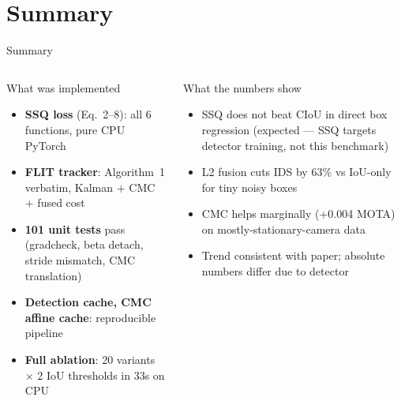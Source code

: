 \documentclass[aspectratio=169, 10pt]{beamer}
\begin{document}
\section{Summary}

\begin{frame}{Summary}

  \begin{columns}[T]


    \begin{block}{What was implemented}
      \begin{itemize}
        \item \textbf{SSQ loss} (Eq.~2--8): all 6 functions, pure CPU PyTorch
        \item \textbf{FLIT tracker}: Algorithm~1 verbatim, Kalman + CMC + fused cost
        \item \textbf{101 unit tests} pass (gradcheck, beta detach, stride mismatch, CMC translation)
        \item \textbf{Detection cache, CMC affine cache}: reproducible pipeline
        \item \textbf{Full ablation}: 20 variants $\times$ 2 IoU thresholds in 33s on CPU
      \end{itemize}
    \end{block}

    \vspace{0.4em}

    \begin{block}{What the numbers show}
      \begin{itemize}
        \item SSQ does not beat CIoU in direct box regression
          (expected — SSQ targets detector training, not this benchmark)
        \item L2 fusion cuts IDS by 63\% vs IoU-only for tiny noisy boxes
        \item CMC helps marginally (+0.004 MOTA) on mostly-stationary-camera data
        \item Trend consistent with paper; absolute numbers differ due to detector
      \end{itemize}
    \end{block}



\end{columns}
\end{frame}
\end{document}

